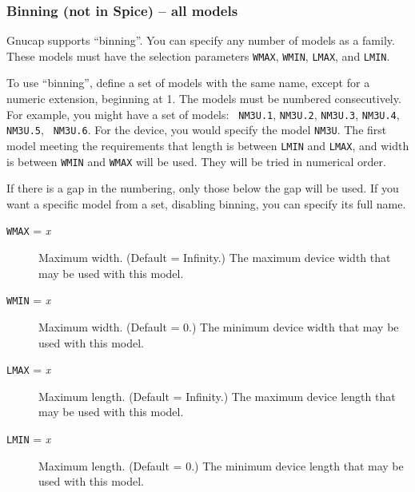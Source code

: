\subsubsection{Binning (not in Spice) -- all models}

Gnucap supports ``binning''.  You can specify any number of models as
a family.  These models must have the selection parameters {\tt WMAX},
{\tt WMIN}, {\tt LMAX}, and {\tt LMIN}.

To use ``binning'', define a set of models with the same name, except
for a numeric extension, beginning at 1.  The models must be numbered
consecutively.  For example, you might have a set of models: {\tt
NM3U.1}, {\tt NM3U.2}, {\tt NM3U.3}, {\tt NM3U.4}, {\tt NM3U.5}, {\tt
NM3U.6}.  For the device, you would specify the model {\tt NM3U}.  The
first model meeting the requirements that length is between {\tt LMIN}
and {\tt LMAX}, and width is between {\tt WMIN} and {\tt WMAX} will be
used.  They will be tried in numerical order.

If there is a gap in the numbering, only those below the gap will be
used.  If you want a specific model from a set, disabling binning, you
can specify its full name.

\begin{description}

\item[{\tt WMAX} = {\it x}]
Maximum width. (Default = Infinity.)  The maximum device width that
may be used with this model.

\item[{\tt WMIN} = {\it x}]
Maximum width. (Default = 0.)  The minimum device width that may be
used with this model.

\item[{\tt LMAX} = {\it x}]
Maximum length. (Default = Infinity.)  The maximum device length that
may be used with this model.

\item[{\tt LMIN} = {\it x}]
Maximum length. (Default = 0.)  The minimum device length that may be
used with this model.

\end{description}
